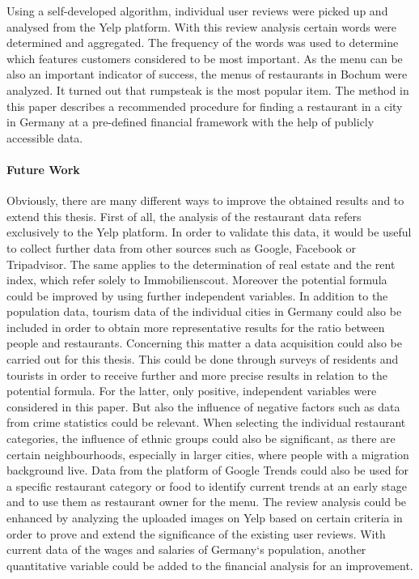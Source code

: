 Using a self-developed algorithm, individual user reviews were picked up and analysed from the Yelp platform. With this review analysis certain words were determined and aggregated. The frequency of the words was used to determine which features customers considered to be most important. %
\newline
As the menu can be also an important indicator of success, the menus of restaurants in Bochum were analyzed. It turned out that rumpsteak is the most popular item.
The method in this paper describes a recommended procedure for finding a restaurant in a city in Germany at a pre-defined financial framework with the help of publicly accessible data.

\paragraph{Future Work}
Obviously, there are many different ways to improve the obtained results and to extend this thesis. First of all, the analysis of the restaurant data refers exclusively to the Yelp platform. In order to validate this data, it would be useful to collect further data from other sources such as Google, Facebook or Tripadvisor. The same applies to the determination of real estate and the rent index, which refer solely to Immobilienscout. \newline
Moreover the potential formula could be improved by using further independent variables. In addition to the population data, tourism data of the individual cities in Germany could also be included in order to obtain more representative results for the ratio between people and restaurants. Concerning this matter a data acquisition could also be carried out for this thesis. This could be done through surveys of residents and tourists in order to receive further and more precise results in relation to the potential formula. For the latter, only positive, independent variables were considered in this paper. But also the influence of negative factors such as data from crime statistics could be relevant. \newline
When selecting the individual restaurant categories, the influence of ethnic groups could also be significant, as there are certain neighbourhoods, especially in larger cities, where people with a migration background live. Data from the platform of Google Trends could also be used for a specific restaurant category or food to identify current trends at an early stage and to use them as restaurant owner for the menu. \newline
The review analysis could be enhanced by analyzing the uploaded images on Yelp based on certain criteria in order to prove and extend the significance of the existing user reviews. With current data of the wages and salaries of Germany‘s population, another quantitative variable could be added to the financial analysis for an improvement. 
